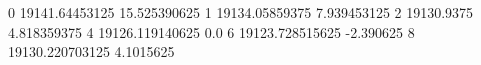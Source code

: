 0 19141.64453125 15.525390625
1 19134.05859375 7.939453125
2 19130.9375 4.818359375
4 19126.119140625 0.0
6 19123.728515625 -2.390625
8 19130.220703125 4.1015625
